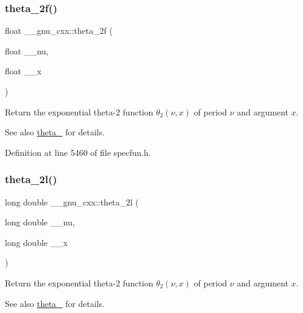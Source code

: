 \subsubsection{\texorpdfstring{theta\+\_\+2f()}{theta\_2f()}}
{\footnotesize\ttfamily float \+\_\+\+\_\+gnu\+\_\+cxx\+::theta\+\_\+2f (\begin{DoxyParamCaption}\item[{float}]{\+\_\+\+\_\+nu,  }\item[{float}]{\+\_\+\+\_\+x }\end{DoxyParamCaption})\hspace{0.3cm}{\ttfamily [inline]}}

Return the exponential theta-\/2 function $ \theta_2(\nu,x) $ of period $ \nu $ and argument $ x $.

\begin{DoxySeeAlso}{See also}
\hyperlink{group__gnu__math__spec__func_ga16f278edeb2842d614bae1f1ae2d0256}{theta\+\_} for details. 
\end{DoxySeeAlso}


Definition at line 5460 of file specfun.\+h.

\mbox{\label{group__gnu__math__spec__func_gac5a30c772d4888442665945e7f3fa017}} 
\subsubsection{\texorpdfstring{theta\+\_\+2l()}{theta\_2l()}}
{\footnotesize\ttfamily long double \+\_\+\+\_\+gnu\+\_\+cxx\+::theta\+\_\+2l (\begin{DoxyParamCaption}\item[{long double}]{\+\_\+\+\_\+nu,  }\item[{long double}]{\+\_\+\+\_\+x }\end{DoxyParamCaption})\hspace{0.3cm}{\ttfamily [inline]}}

Return the exponential theta-\/2 function $ \theta_2(\nu,x) $ of period $ \nu $ and argument $ x $.

\begin{DoxySeeAlso}{See also}
\hyperlink{group__gnu__math__spec__func_ga16f278edeb2842d614bae1f1ae2d0256}{theta\+\_} for details. 
\end{DoxySeeAlso}


